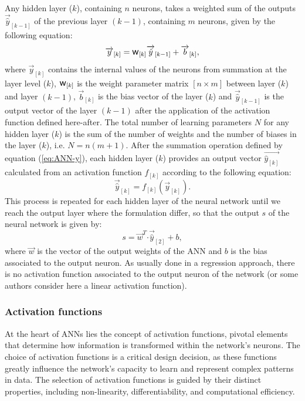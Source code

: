 \documentclass[algorithms,article,submit,pdftex,moreauthors]{Definitions/mdpi}
\DeclareRobustCommand{\w}{\mbox{\large\ensuremath{\mathsf{w}}}}
\DeclareRobustCommand{\dotp}{\boldsymbol{\cdot}}
\DeclareRobustCommand{\lay}[1]{_{[#1]}}
\begin{document}
Any hidden layer ($k$), containing $n$ neurons, takes a weighted sum of the outputs $\overrightarrow{\hat{y}}\lay{k-1}$ of the previous layer $(k-1)$, containing $m$ neurons, given by the following equation:
\begin{equation}
\overrightarrow{y}\lay{k} = \w\lay{k} \overrightarrow{\hat{y}}\lay{k-1}+ \overrightarrow{b}\lay{k}\label{eq:ANN-y},
\end{equation}
where $\overrightarrow{y}\lay{k}$ contains the internal values of the neurons from summation at the layer level ($k$), $\w\lay{k}$ is the weight parameter matrix $[n\times m]$ between layer ($k$) and layer $(k-1)$, $\overrightarrow{b}\lay{k}$ is the bias vector of the layer ($k$) and $\overrightarrow{\hat{y}}\lay{k-1}$ is the output vector of the layer $(k-1)$ after the application of the activation function defined here-after.
The total number of learning parameters $N$ for any hidden layer ($k$) is the sum of the number of weights and the number of biases in the layer ($k$), i.e. $N=n(m+1)$.
After the summation operation defined by equation (\ref{eq:ANN-y}), each hidden layer ($k$) provides an output vector $\overrightarrow{\hat{y}\lay{k}}$ calculated from an activation function $f\lay{k}$ according to the following equation:
\begin{equation}
\overrightarrow{\hat{y}}\lay{k}=f\lay{k}(\overrightarrow{y}\lay{k}).
\label{eq:ANN-f}
\end{equation}
This process is repeated for each hidden layer of the neural network until we reach the output layer where the formulation differ, so that the output $s$ of the neural network is given by:
\begin{equation}
s = \overrightarrow{w}^T \dotp \overrightarrow{\hat{y}}\lay{2} + b\label{eq:ANN-s},
\end{equation}
where $\overrightarrow{w}$ is the vector of the output weights of the ANN and $b$ is the bias associated to the output neuron.
As usually done in a regression approach, there is no activation function associated to the output neuron of the network (or some authors consider here a linear activation function).

\subsubsection{Activation functions\label{subsubsec:ANN-act}}

At the heart of ANNs lies the concept of activation functions, pivotal elements that determine how information is transformed within the network's neurons.
The choice of activation functions is a critical design decision, as these functions greatly influence the network's capacity to learn and represent complex patterns in data.
The selection of activation functions is guided by their distinct properties, including non-linearity, differentiability, and computational efficiency.
\end{document}
